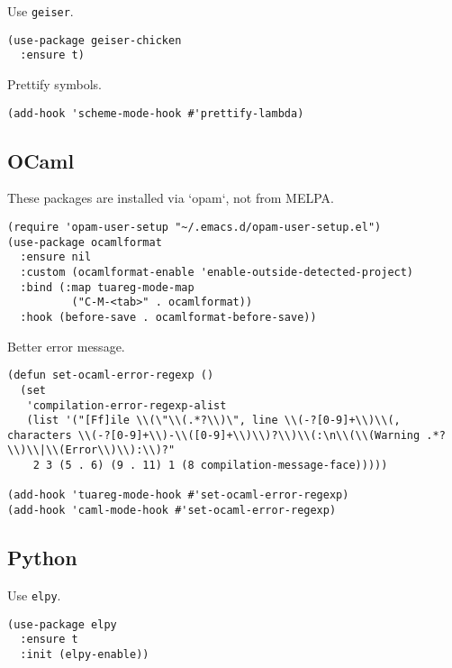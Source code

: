 \documentclass[a4paper,11pt]{article}
\begin{document}
Use \texttt{geiser}.
\begin{verbatim}
(use-package geiser-chicken
  :ensure t)
\end{verbatim}

Prettify symbols.
\begin{verbatim}
(add-hook 'scheme-mode-hook #'prettify-lambda)
\end{verbatim}

\subsection{OCaml}
\label{sec:orgb79d180}
These packages are installed via `opam`, not from MELPA.
\begin{verbatim}
(require 'opam-user-setup "~/.emacs.d/opam-user-setup.el")
(use-package ocamlformat
  :ensure nil
  :custom (ocamlformat-enable 'enable-outside-detected-project)
  :bind (:map tuareg-mode-map
	      ("C-M-<tab>" . ocamlformat))
  :hook (before-save . ocamlformat-before-save))
\end{verbatim}

Better error message.
\begin{verbatim}
(defun set-ocaml-error-regexp ()
  (set
   'compilation-error-regexp-alist
   (list '("[Ff]ile \\(\"\\(.*?\\)\", line \\(-?[0-9]+\\)\\(, characters \\(-?[0-9]+\\)-\\([0-9]+\\)\\)?\\)\\(:\n\\(\\(Warning .*?\\)\\|\\(Error\\)\\):\\)?"
    2 3 (5 . 6) (9 . 11) 1 (8 compilation-message-face)))))

(add-hook 'tuareg-mode-hook #'set-ocaml-error-regexp)
(add-hook 'caml-mode-hook #'set-ocaml-error-regexp)
\end{verbatim}

\subsection{Python}
\label{sec:org83ad87f}
Use \texttt{elpy}.
\begin{verbatim}
(use-package elpy
  :ensure t
  :init (elpy-enable))
\end{verbatim}
\end{document}
